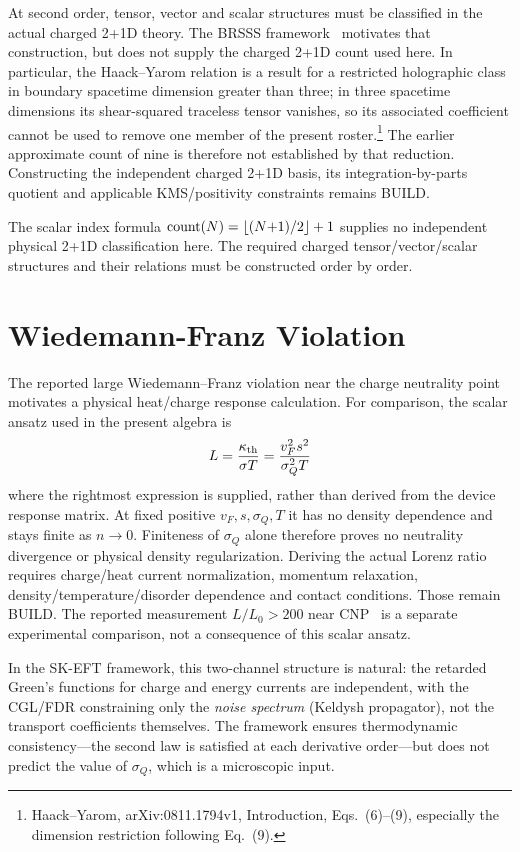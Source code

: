 \documentclass[aps,prd,twocolumn,showpacs,superscriptaddress,nofootinbib]{revtex4-2}
\begin{document}
At second order, tensor, vector and scalar structures must be
classified in the actual charged 2+1D theory. The BRSSS
framework~\cite{BRSSS2008} motivates that construction, but does not
supply the charged 2+1D count used here. In particular, the
Haack--Yarom relation is a result for a restricted holographic class
in boundary spacetime dimension greater than three; in three
spacetime dimensions its shear-squared traceless tensor vanishes,
so its associated coefficient cannot be used to remove one member
of the present roster.\footnote{Haack--Yarom, arXiv:0811.1794v1,
Introduction, Eqs.~(6)--(9), especially the dimension restriction
following Eq.~(9).} The earlier approximate count of nine is
therefore not established by that reduction. Constructing the
independent charged 2+1D basis, its integration-by-parts quotient
and applicable KMS/positivity constraints remains BUILD.

The scalar index formula ${\rm count}(N)=
\lfloor(N{+}1)/2\rfloor+1$ supplies no independent physical
2+1D classification here. The required charged tensor/vector/scalar
structures and their relations must be constructed order by order.

\section{Wiedemann-Franz Violation}
\label{sec:wf}

The reported large Wiedemann--Franz violation near the charge
neutrality point motivates a physical heat/charge response calculation.
For comparison, the scalar ansatz used in the present algebra is
\begin{equation}
L = \frac{\kappa_{\rm th}}{\sigma T} = \frac{v_F^2 s^2}{\sigma_Q^2 T}
\label{eq:lorenz}
\end{equation}
where the rightmost expression is supplied, rather than derived
from the device response matrix. At fixed positive $v_F,s,\sigma_Q,T$
it has no density dependence and stays finite as $n\to0$.
Finiteness of $\sigma_Q$ alone therefore proves no neutrality
divergence or physical density regularization. Deriving the actual
Lorenz ratio requires charge/heat current normalization, momentum
relaxation, density/temperature/disorder dependence and contact
conditions. Those remain BUILD. The reported measurement
$L/L_0>200$ near CNP~\cite{Majumdar2025} is a separate experimental
comparison, not a consequence of this scalar ansatz.

In the SK-EFT framework, this two-channel structure is natural: the retarded
Green's functions for charge and energy currents are independent, with the
CGL/FDR constraining only the \emph{noise spectrum} (Keldysh propagator),
not the transport coefficients themselves. The framework ensures
thermodynamic consistency---the second law is satisfied at each derivative
order---but does not predict the value of $\sigma_Q$, which is a microscopic
input.
\end{document}
